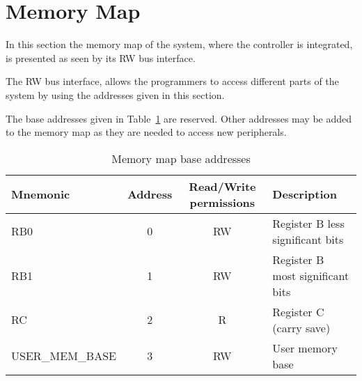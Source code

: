 \section{Memory Map}
\label{sec:mem_map}

In this section the memory map of the system, where the controller is
integrated, is presented as seen by its RW bus interface.

The RW bus interface, allows the programmers to access different parts
of the system by using the addresses given in this section.

The base addresses given in Table~\ref{tab:memmap} are reserved. Other
addresses may be added to the memory map as they are needed to access
new peripherals.

\begin{table}[!htbp]
  \centering
    \begin{tabular}{|p{3cm}|c|c|p{5cm}|}
    \hline 
    {\bf Mnemonic} & {\bf Address} & {\bf Read/Write permissions} & {\bf Description} \\
    \hline \hline 
     RB0 & 0 & RW & Register B less significant bits \\
    \hline
     RB1 & 1 & RW & Register B most significant bits \\
    \hline
     RC  & 2 & R & Register C (carry save) \\
    \hline
     USER\_MEM\_BASE & 3 & RW &  User memory base\\
    \hline
 
    \end{tabular}
  \caption{Memory map base addresses}
  \label{tab:memmap}
\end{table}


